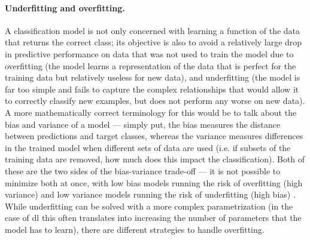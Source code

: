 \paragraph{Underfitting and overfitting.} A classification model is not only concerned with learning a function of the data that returns the correct class; its objective is also to avoid a relatively large drop in predictive performance on data that was not used to train the model due to overfitting (the model learns a representation of the data that is perfect for the training data but relatively useless for new data), and underfitting (the model is far too simple and fails to capture the complex relationships that would allow it to correctly classify new examples, but does not perform any worse on new data). A more mathematically correct terminology for this would be to talk about the bias and variance of a model --- simply put, the bias measures the distance between predictions and target classes, whereas the variance measures differences in the trained model when different sets of data are used (i.e. if subsets of the training data are removed, how much does this impact the classification). Both of these are the two sides of the bias-variance trade-off --- it is not possible to minimize both at once, with low bias models running the risk of overfitting (high variance) and low variance models running the risk of underfitting (high bias) \cite{James2013-py}. While underfitting can be solved with a more complex parametrization (in the case of \ac{dl} this often translates into increasing the number of parameters that the model has to learn), there are different strategies to handle overfitting.

